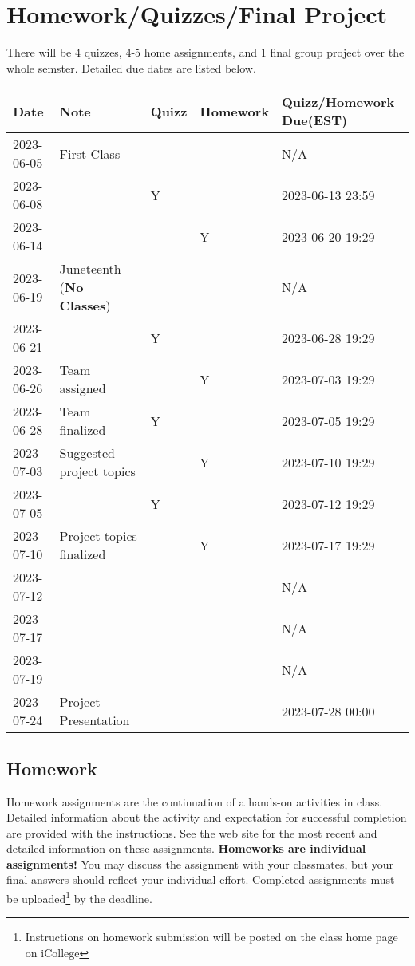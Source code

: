 \documentclass{article}
\begin{document}
\section{Homework/Quizzes/Final Project}
There will be 4 quizzes, 4-5 home assignments, and 1 final group project over the whole semster. Detailed due dates are listed below.
\begin{center}
	\begin{tabular}{lllll}
		\hline
		Date & Note & Quizz & Homework & Quizz/Homework Due(EST) \\
		\hline
		2023-06-05 & First Class &  &  & N/A \\
        2023-06-08 & & Y & & 2023-06-13 23:59 \\
        2023-06-14 &  &  & Y & 2023-06-20 19:29 \\
        2023-06-19 & Juneteenth (\textbf{No Classes})  &  &  &  N/A\\
        2023-06-21 &  & Y &  & 2023-06-28 19:29 \\
        2023-06-26 & Team assigned &  & Y & 2023-07-03 19:29 \\
        2023-06-28 & Team finalized  & Y &  & 2023-07-05 19:29 \\
        2023-07-03 & Suggested project topics &  & Y & 2023-07-10 19:29 \\
        2023-07-05 &  & Y &  & 2023-07-12 19:29 \\
        2023-07-10 & Project topics finalized &  & Y & 2023-07-17 19:29 \\
        2023-07-12 &  &  &  &  N/A\\
        2023-07-17 &  &  &  &  N/A\\
        2023-07-19 &  &  &  &  N/A\\
		2023-07-24 & Project Presentation &  &  & 2023-07-28 00:00\\
		\hline        
	\end{tabular}
\end{center}



\subsection{Homework}
Homework assignments are the continuation of a hands-on activities in class. Detailed information about the activity and expectation for successful completion are provided with the instructions. See the web site for the most recent and detailed information on these assignments. \textbf{Homeworks are individual assignments!} You may discuss the assignment with your classmates, but your ﬁnal answers should reﬂect your individual eﬀort. Completed assignments must be uploaded\footnote{Instructions on homework submission will be posted on the class home page on iCollege} by the deadline.
\end{document}
